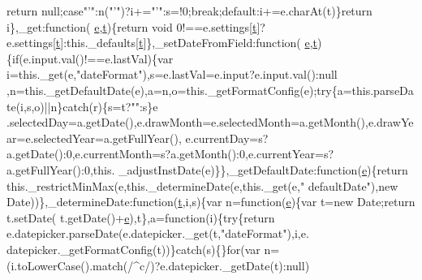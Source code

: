 \begin{DoxyCode}
{      return} null;\textcolor{keywordflow}{case}\textcolor{stringliteral}{"'"}:n(\textcolor{stringliteral}{"'"})?i+=\textcolor{stringliteral}{"'"}:s=!0;\textcolor{keywordflow}{break};\textcolor{keywordflow}{default}:i+=e.charAt(t)\}\textcolor{keywordflow}{return} i\},\_get:\textcolor{keyword}{function}(
      \hyperlink{jquery-ui_8min_8js_a2c038346d47955cbe2cb91e338edd7e1}{e},\hyperlink{jquery-2_80_83_8min_8js_aaccc9105df5383111407fd5b41255e23}{t})\{\textcolor{keywordflow}{return} \textcolor{keywordtype}{void} 0!==e.settings[\hyperlink{jquery-2_80_83_8min_8js_aaccc9105df5383111407fd5b41255e23}{t}]?e.settings[\hyperlink{jquery-2_80_83_8min_8js_aaccc9105df5383111407fd5b41255e23}{t}]:this.\_defaults[\hyperlink{jquery-2_80_83_8min_8js_aaccc9105df5383111407fd5b41255e23}{t}]\},\_setDateFromField:\textcolor{keyword}{function}(
      \hyperlink{jquery-ui_8min_8js_a2c038346d47955cbe2cb91e338edd7e1}{e},\hyperlink{jquery-2_80_83_8min_8js_aaccc9105df5383111407fd5b41255e23}{t})\{\textcolor{keywordflow}{if}(e.input.val()!==e.lastVal)\{var i=this.\_get(e,\textcolor{stringliteral}{"dateFormat"}),s=e.lastVal=e.input?e.input.val():null
      ,n=this.\_getDefaultDate(e),a=n,o=this.\_getFormatConfig(e);\textcolor{keywordflow}{try}\{a=this.parseDate(i,s,o)||n\}\textcolor{keywordflow}{catch}(r)\{s=t?\textcolor{stringliteral}{""}:s\}e
      .selectedDay=a.getDate(),e.drawMonth=e.selectedMonth=a.getMonth(),e.drawYear=e.selectedYear=a.getFullYear(),
      e.currentDay=s?a.getDate():0,e.currentMonth=s?a.getMonth():0,e.currentYear=s?a.getFullYear():0,this.
      \_adjustInstDate(e)\}\},\_getDefaultDate:\textcolor{keyword}{function}(\hyperlink{jquery-ui_8min_8js_a2c038346d47955cbe2cb91e338edd7e1}{e})\{\textcolor{keywordflow}{return} this.\_restrictMinMax(e,this.\_determineDate(e,this.\_get(e,\textcolor{stringliteral}{"
      defaultDate"}),\textcolor{keyword}{new} Date))\},\_determineDate:\textcolor{keyword}{function}(\hyperlink{jquery-2_80_83_8min_8js_aaccc9105df5383111407fd5b41255e23}{t},i,s)\{var n=\textcolor{keyword}{function}(\hyperlink{jquery-ui_8min_8js_a2c038346d47955cbe2cb91e338edd7e1}{e})\{var t=\textcolor{keyword}{new} Date;\textcolor{keywordflow}{return} t.setDate(
      t.getDate()+\hyperlink{jquery-ui_8min_8js_a2c038346d47955cbe2cb91e338edd7e1}{e}),t\},a=\textcolor{keyword}{function}(i)\{\textcolor{keywordflow}{try}\{\textcolor{keywordflow}{return} e.datepicker.parseDate(e.datepicker.\_get(t,\textcolor{stringliteral}{"dateFormat"}),i,e.
      datepicker.\_getFormatConfig(t))\}\textcolor{keywordflow}{catch}(s)\{\}\textcolor{keywordflow}{for}(var n=(i.toLowerCase().match(/^c/)?e.datepicker.\_getDate(t):null)

\end{DoxyCode}
